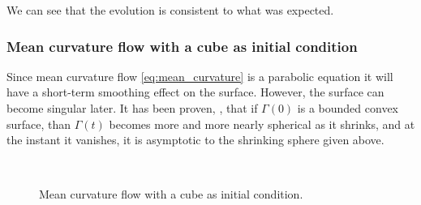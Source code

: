\documentclass[a4paper,11pt, onecolumn]{article}
\begin{document}
\noindent We can see that the evolution is consistent to what was expected.

\subsubsection{Mean curvature flow with a cube as initial condition}

Since mean curvature flow \eqref{eq:mean_curvature} is a parabolic equation it will have a short-term smoothing effect on the surface. However, the surface can become singular later. It has been proven, \cite{Huisken84}, that if $\Gamma(0)$ is a bounded convex surface, than $\Gamma(t)$ becomes more and more nearly spherical as it shrinks, and at the instant it vanishes, it is asymptotic to the shrinking sphere given above.
\newline

\begin{figure}[htbp]
  \centering
  \quad
  \\
  \quad
  \caption{Mean curvature flow with a cube as initial condition.}
  \label{fig:mcf_cube}
\end{figure}
\end{document}
